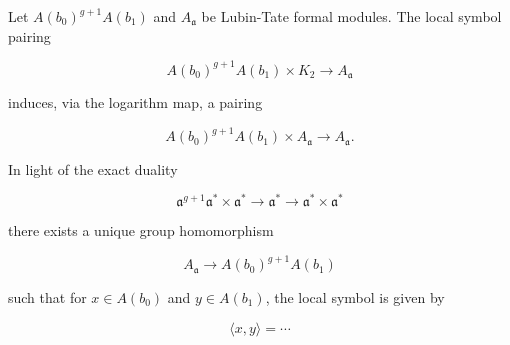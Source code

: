 Let $A(b_0)^{g+1}A(b_1)$ and $A_{\mathfrak{a}}$ be Lubin-Tate formal modules. The local symbol pairing

$$
A(b_0)^{g+1}A(b_1) \times K_2 \longrightarrow A_{\mathfrak{a}}
$$

induces, via the logarithm map, a pairing

$$
A(b_0)^{g+1}A(b_1) \times A_{\mathfrak{a}} \longrightarrow A_{\mathfrak{a}}.
$$

In light of the exact duality

$$
\mathfrak{a}^{g+1}\mathfrak{a}^* \times \mathfrak{a}^* \longrightarrow \mathfrak{a}^* \longrightarrow \mathfrak{a}^* \times \mathfrak{a}^*
$$

there exists a unique group homomorphism

$$
A_{\mathfrak{a}} \longrightarrow A(b_0)^{g+1}A(b_1)
$$

such that for $x \in A(b_0)$ and $y \in A(b_1)$, the local symbol is given by

$$
\langle x, y \rangle = \cdots
$$
